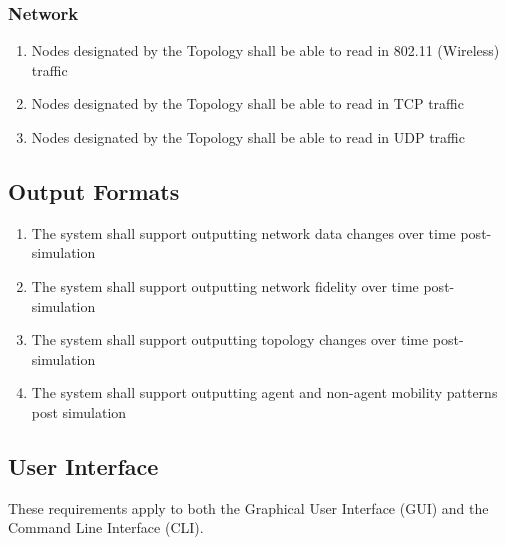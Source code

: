 \documentclass[titlepage]{article}
\begin{document}
\subsubsection{Network}
\begin{enumerate}
		\item Nodes designated by the Topology shall be able to read in 802.11 (Wireless) traffic
		\item Nodes designated by the Topology shall be able to read in TCP traffic
		\item Nodes designated by the Topology shall be able to read in UDP traffic
\end{enumerate}



\subsection{Output Formats%
  \label{output-formats}%
}

\begin{enumerate}
    \item The system shall support outputting network data changes over time post-simulation
		\item The system shall support outputting network fidelity over time post-simulation
		\item The system shall support outputting topology changes over time post-simulation
		\item The system shall support outputting agent and non-agent mobility patterns post simulation
\end{enumerate}


\subsection{User Interface%
  \label{user-interface}%
}

These requirements apply to both the Graphical User Interface (GUI) and the
Command Line Interface (CLI).
\end{document}
